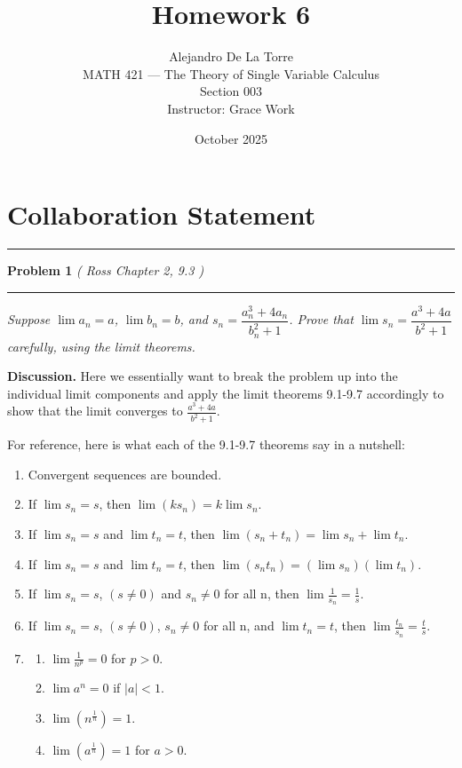 \documentclass[12pt]{article}
\title{Homework 6}
\author{Alejandro De La Torre \\ MATH 421 — The Theory of Single Variable Calculus \\ Section 003 \\ Instructor: Grace Work}
\date{October 2025}
\newcommand{\problem}[2][]{%
  \vspace{0.5em}
  \hrule\vspace{0.4em}
  \textbf{Problem #2}\if\relax\detokenize{#1}\relax\else\; \textit{(#1)}\fi
  \vspace{0.25em}\hrule\vspace{0.8em}
}
\begin{document}
\maketitle

\section*{Collaboration Statement}


\bigskip


\problem[ Ross Chapter 2, 9.3 ]{1}
\textit{Suppose $\lim a_n = a$, $\lim b_n = b$, and $s_n = \dfrac{a_n^3 + 4a_n}{b_n^2 + 1}$. Prove that $\lim s_n = \dfrac{a^3 + 4a}{b^2 + 1}$ carefully, using the limit theorems.}

\vspace{0.75em}
\textbf{Discussion.} %
Here we essentially want to break the problem up into the individual limit components and apply the limit theorems 9.1-9.7 accordingly to show that the limit converges to $\frac{a^3+4a}{b^2+1}$.

For reference, here is what each of the 9.1-9.7 theorems say in a nutshell:
\begin{center}
\begin{minipage}{0.7\textwidth}
\begin{footnotesize}
\begin{enumerate}[label=9.\arabic* Theorem:]
    \item Convergent sequences are bounded.
    \item If $\lim s_n = s$, then $\lim (ks_n) = k \lim s_n$.
    \item If $\lim s_n = s$ and $\lim t_n = t$, then $\lim (s_n + t_n ) = \lim s_n + \lim t_n$.
    \item If $\lim s_n = s$ and $\lim t_n = t$, then $\lim (s_n t_n) = (\lim s_n)(\lim t_n)$.
    \item If $\lim s_n = s$, $(s \neq 0)$  and $s_n \neq 0$ for all n, then $\lim \frac{1}{s_n}= \frac{1}{s}$.
    \item If $\lim s_n = s$, $(s \neq 0)$, $s_n \neq 0$ for all n, and $\lim t_n = t$, then $\lim \frac{t_n}{s_n}=\frac{t}{s}$.
    \item  
    \begin{enumerate}
        \item $\lim \frac{1}{n^p}=0$ for $p>0$.
        \item $\lim a^n=0$ if $|a|<1$.
        \item $\lim (n^{\frac{1}{n}})=1$.
        \item $\lim (a^{\frac{1}{n}})=1$ for $a > 0$.
    \end{enumerate}
\end{enumerate}
\end{footnotesize}
\end{minipage}
\end{center}
\vspace{0.25em}
\end{document}
